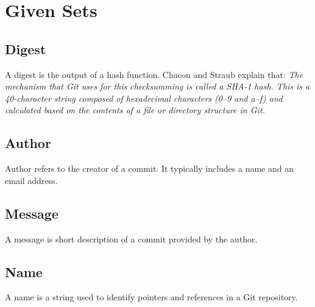 \section{Given Sets}

\subsection{Digest}

A digest is the output of a hash function. Chacon and Straub explain that:
\textit{The mechanism that Git uses for this checksumming is called a SHA-1
hash. This is a 40-character string composed of hexadecimal characters (0–9 and
a–f) and calculated based on the contents of a file or directory structure in
Git.}~\cite{chacon}

\begin{zed}
	[Digest]
\end{zed}

\subsection{Author}

Author refers to the creator of a commit. It typically includes a name and
an email address.

\begin{zed}
	[Author]
\end{zed}

\subsection{Message}

A message is short description of a commit provided by the author.

\begin{zed}
  [Message]
\end{zed}

\subsection{Name}

A name is a string used to identify pointers and references in a 
Git repository.

\begin{zed}
	[Name]
\end{zed}
